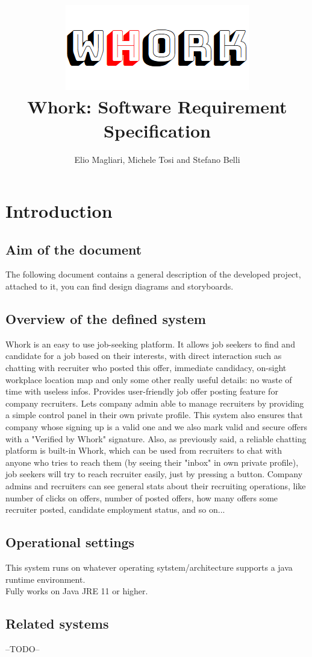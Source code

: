 \documentclass[12pt, a4paper]{article}
\title{\includegraphics{logo.png}\\Whork: Software Requirement Specification}
\author{Elio Magliari, Michele Tosi and Stefano Belli}
\date{}
\begin{document}
\maketitle
\section{Introduction}
\subsection{Aim of the document}
The following document contains a general description of the developed project, attached to it, you can find
design diagrams and storyboards.
\subsection{Overview of the defined system}
Whork is an easy to use job-seeking platform. It allows job seekers to find and candidate for a job based on their interests, with direct interaction such as
chatting with recruiter who posted this offer, immediate candidacy, on-sight workplace location map and only some other really useful details: no waste of time with useless infos.
Provides user-friendly job offer posting feature for company recruiters. Lets company admin able to manage recruiters by providing
a simple control panel in their own private profile. This system also ensures that company whose signing up is a valid one and we also mark
valid and secure offers with a "Verified by Whork" signature. Also, as previously said, a reliable chatting platform is built-in Whork, which can be used from recruiters to chat with
anyone who tries to reach them (by seeing their "inbox" in own private profile), job seekers will try to reach recruiter easily, just by pressing a button. Company admins and recruiters
can see general stats about their recruiting operations, like number of clicks on offers, number of posted offers, how many offers some recruiter posted, candidate employment status, and so on...
\subsection{Operational settings}
This system runs on whatever operating sytstem/architecture supports a java runtime environment.\\
 Fully works on Java JRE 11 or higher.
\subsection{Related systems}
--TODO--
\end{document}
